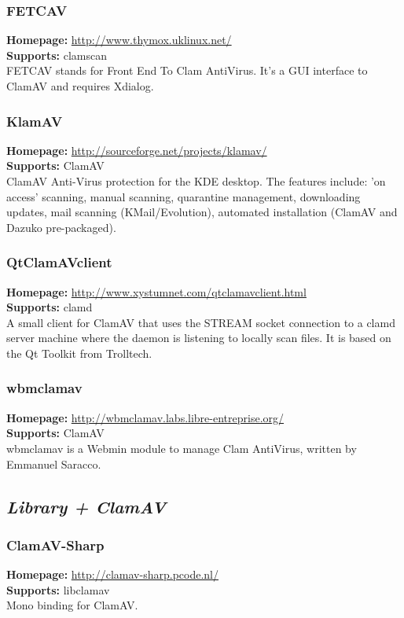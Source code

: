 \documentclass[a4paper,titlepage,12pt]{article}
\begin{document}
    \subsubsection{FETCAV}
    \textbf{Homepage:} \url{http://www.thymox.uklinux.net/}\\
    \textbf{Supports:} clamscan\\[4pt]
    FETCAV stands for Front End To Clam AntiVirus. It's a GUI interface
    to ClamAV and requires Xdialog.

    \subsubsection{KlamAV}
    \textbf{Homepage:} \url{http://sourceforge.net/projects/klamav/}\\
    \textbf{Supports:} ClamAV\\[4pt]
    ClamAV Anti-Virus protection for the KDE desktop. The features include:
    'on access' scanning, manual scanning, quarantine management, downloading
    updates, mail scanning (KMail/Evolution), automated installation (ClamAV
    and Dazuko pre-packaged).

    \subsubsection{QtClamAVclient}
    \textbf{Homepage:} \url{http://www.xystumnet.com/qtclamavclient.html}\\
    \textbf{Supports:} clamd\\[4pt]
    A small client for ClamAV that uses the STREAM socket connection to a
    clamd server machine where the daemon is listening to locally scan files.
    It is based on the Qt Toolkit from Trolltech.

    \subsubsection{wbmclamav}
    \textbf{Homepage:} \url{http://wbmclamav.labs.libre-entreprise.org/}\\
    \textbf{Supports:} ClamAV\\[4pt]
    wbmclamav is a Webmin module to manage Clam AntiVirus, written by
    Emmanuel Saracco. 

    \subsection{\emph{Library + ClamAV}}

    \subsubsection{ClamAV-Sharp}
    \textbf{Homepage:} \url{http://clamav-sharp.pcode.nl/}\\
    \textbf{Supports:} libclamav\\[4pt]
    Mono binding for ClamAV.
\end{document}
